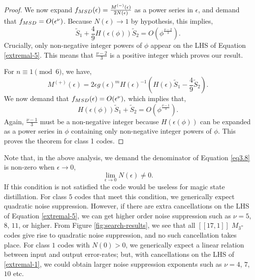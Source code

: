 \documentclass[11pt]{article}
\begin{document}
\begin{proof}
We now expand $f_{\rm MSD}(\epsilon)=\frac{M^{(-)}(\epsilon)}{2N(\epsilon)}$ as a power series in $\epsilon$, and demand that $f_{\rm MSD} = O(\epsilon^\nu)$.
Because $N(\epsilon) \to 1$ by hypothesis, this implies,
\begin{equation}
\tilde{S}_1+\frac{4}{9}H(\epsilon(\phi)) \tilde{S}_2 = O(\phi^{\frac{\nu-2}{3}}). \label{extremal-5}
\end{equation}
Crucially, only non-negative integer powers of $\phi$ appear on the LHS of Equation \eqref{extremal-5}. This means that $\frac{\nu-2}{3}$ is a positive integer which proves our result. 

For $n \equiv 1 \pmod 6$, we have,
\begin{equation}
M^{(+)}(\epsilon)=2\epsilon g(\epsilon)^{m} H(\epsilon)^{-1}\left( H(\epsilon)\tilde S_{1}-\frac{4}{9}\tilde S_{2} \right).
\end{equation}
We now demand that $f_{\rm MSD}(\epsilon)=O(\epsilon^\nu),$
which implies that,
\begin{equation}
 H(\epsilon(\phi))\tilde{S}_1+ \tilde{S}_2 = O(\phi^{\frac{\nu-1}{3}}). \label{extremal-1}
\end{equation}
Again, $\frac{\nu-1}{3}$ must be a non-negative integer because $H(\epsilon(\phi))$ can be expanded as a power series in $\phi$ containing only non-negative integer powers of $\phi$. This proves the theorem for class 1 codes. 
\end{proof}

Note that, in the above analysis, we demand the denominator of Equation \eqref{eq3.8} is non-zero when $\epsilon \to 0$,
\begin{equation}
\lim_{\epsilon \to 0} N(\epsilon) \neq 0.
\end{equation} 
If this condition is not satisfied the code would be useless for magic state distillation. For class $5$ codes that meet this condition, we generically   expect quadratic noise suppression. However, if there are extra cancellations on the LHS of Equation \eqref{extremal-5}, we can get higher order noise suppression such as $\nu = 5$, $8$, $11$, or higher. From Figure \ref{fig:search-results}, we see that all $[[17,1]]$ $M_3$-codes give rise to quadratic noise suppression, and no such cancellation takes place. For class $1$ codes with $N(0) >0$, we generically expect  a linear relation between input and output error-rates; but, with cancellations on the LHS of \eqref{extremal-1}, we could obtain larger noise suppression exponents such as $\nu=4$, $7$, $10$ etc. 
\end{document}
